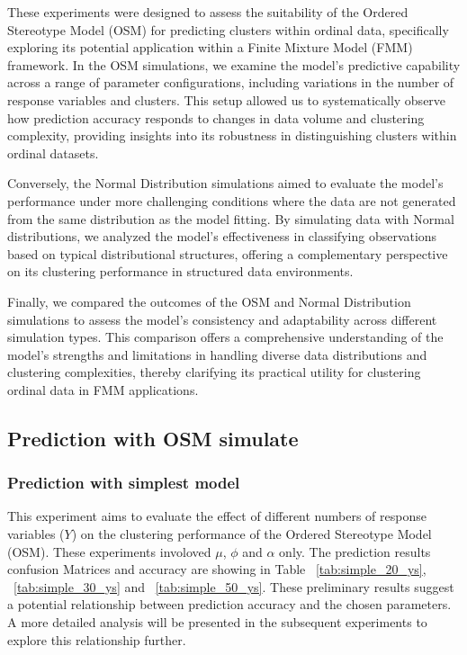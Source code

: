 \documentclass{article}
\begin{document}
These experiments were designed to assess the suitability of the Ordered Stereotype Model (OSM) for predicting clusters within ordinal data, specifically exploring its potential application within a Finite Mixture Model (FMM) framework. In the OSM simulations, we examine the model’s predictive capability across a range of parameter configurations, including variations in the number of response variables and clusters. This setup allowed us to systematically observe how prediction accuracy responds to changes in data volume and clustering complexity, providing insights into its robustness in distinguishing clusters within ordinal datasets.

Conversely, the Normal Distribution simulations aimed to evaluate the model’s performance under more challenging conditions where the data are not generated from the same distribution as the model fitting. By simulating data with Normal distributions, we analyzed the model’s effectiveness in classifying observations based on typical distributional structures, offering a complementary perspective on its clustering performance in structured data environments.

Finally, we compared the outcomes of the OSM and Normal Distribution simulations to assess the model’s consistency and adaptability across different simulation types. This comparison offers a comprehensive understanding of the model’s strengths and limitations in handling diverse data distributions and clustering complexities, thereby clarifying its practical utility for clustering ordinal data in FMM applications.
\subsection{Prediction with OSM simulate}

\subsubsection{Prediction with simplest model}

This experiment aims to evaluate the effect of different numbers of response variables (\( Y \)) on the clustering performance of the Ordered Stereotype Model (OSM). These experiments involoved $\mu$, $\phi$ and $\alpha$ only.
The prediction results confusion Matrices and accuracy are showing in Table ~\ref*{tab:simple_20_ys}, ~\ref*{tab:simple_30_ys} and ~\ref*{tab:simple_50_ys}. 
These preliminary results suggest a potential relationship between prediction accuracy and the chosen parameters. 
A more detailed analysis will be presented in the subsequent experiments to explore this relationship further.
\end{document}
